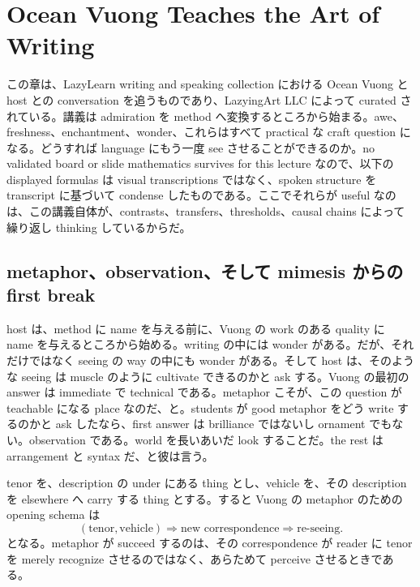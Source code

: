 \chapter{Ocean Vuong Teaches the Art of Writing}

この章は、LazyLearn writing and speaking collection における Ocean Vuong と host との conversation を追うものであり、LazyingArt LLC によって curated されている。講義は admiration を method へ変換するところから始まる。awe、freshness、enchantment、wonder、これらはすべて practical な craft question になる。どうすれば language にもう一度 see させることができるのか。no validated board or slide mathematics survives for this lecture なので、以下の displayed formulas は visual transcriptions ではなく、spoken structure を transcript に基づいて condense したものである。ここでそれらが useful なのは、この講義自体が、contrasts、transfers、thresholds、causal chains によって繰り返し thinking しているからだ。

\section{metaphor、observation、そして mimesis からの first break}

host は、method に name を与える前に、Vuong の work のある quality に name を与えるところから始める。writing の中には wonder がある。だが、それだけではなく seeing の way の中にも wonder がある。そして host は、そのような seeing は muscle のように cultivate できるのかと ask する。Vuong の最初の answer は immediate で technical である。metaphor こそが、この question が teachable になる place なのだ、と。students が good metaphor をどう write するのかと ask したなら、first answer は brilliance ではないし ornament でもない。observation である。world を長いあいだ look することだ。the rest は arrangement と syntax だ、と彼は言う。

\begin{definition}
tenor を、description の under にある thing とし、vehicle を、その description を elsewhere へ carry する thing とする。すると Vuong の metaphor のための opening schema は
\begin{equation}
(\text{tenor},\text{vehicle}) \Longrightarrow \text{new correspondence} \Longrightarrow \text{re-seeing}.
\end{equation}
となる。metaphor が succeed するのは、その correspondence が reader に tenor を merely recognize させるのではなく、あらためて perceive させるときである。
\end{definition}

